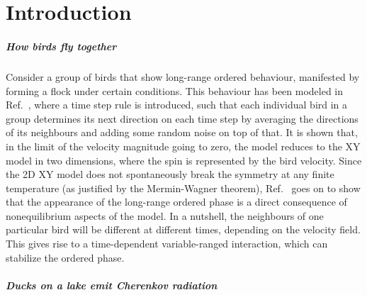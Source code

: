 \chapter{Introduction}



\paragraph{How birds fly together}%
Consider a group of birds that show long-range ordered behaviour,
manifested by forming a flock under certain conditions. This behaviour
has been modeled in Ref.~\cite{Toner1995}, where a time step rule is
introduced, such that each individual bird in a group determines its
next direction on each time step by averaging the directions of its
neighbours and adding some random noise on top of that. It is shown
that, in the limit of the velocity magnitude going to zero, the model
reduces to the XY model in two dimensions, where the spin is
represented by the bird velocity. Since the 2D XY model does not
spontaneously break the symmetry at any finite temperature (as
justified by the Mermin-Wagner theorem), Ref.~\cite{Toner1995} goes on
to show that the appearance of the long-range ordered phase is a
direct consequence of nonequilibrium aspects of the model. In a
nutshell, the neighbours of one particular bird will be different at
different times, depending on the velocity field. This gives rise to a
time-dependent variable-ranged interaction, which can stabilize the
ordered phase.

\paragraph{Ducks on a lake emit Cherenkov radiation}%


